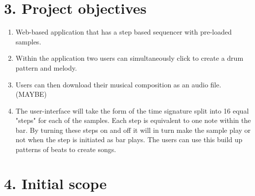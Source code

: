 \documentclass[a4paper]{article}
\begin{document}
\section{3. Project objectives}

\begin{enumerate}
    \item Web-based application that has a step based sequencer with pre-loaded samples.
    \item Within the application two users can simultaneously click to create a drum pattern and melody.
    \item Users can then download their musical composition as an audio file. (MAYBE)
    \item The user-interface will take the form of the time signature split into 16 equal "steps" for each of the samples. Each step is equivalent to one note within the bar. By turning these steps on and off it will in turn make the sample play or not when the step is initiated as bar plays. The users can use this build up patterns of beats to create songs.
\end{enumerate}

\section{4. Initial scope}
\end{document}
